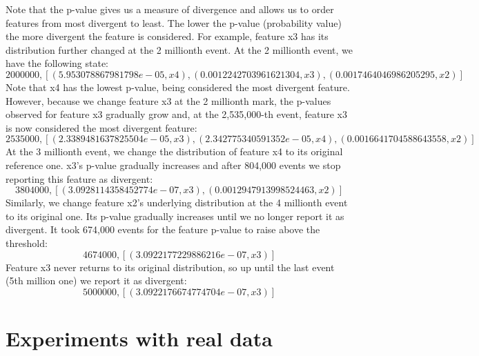 Note that the p-value gives us a measure of divergence and allows us to order features from most divergent to least. The lower the p-value (probability value) the more divergent the feature is considered. For example, feature x3 has its distribution further changed at the 2 millionth event. At the 2 millionth event, we have the following state:
\[2000000, [(5.953078867981798e-05, x4), (0.0012242703961621304, x3), (0.0017464046986205295, x2)]\]
Note that x4 has the lowest p-value, being considered the most divergent feature. However, because we change feature x3 at the 2 millionth mark, the p-values observed for feature x3 gradually grow and, at the 2,535,000-th event, feature x3 is now considered the most divergent feature:
\[2535000, [(2.3389481637825504e-05, x3), (2.342775340591352e-05, x4), (0.0016641704588643558, x2)]\]
At the 3 millionth event, we change the distribution of feature x4 to its original reference one. x3's p-value gradually increases and after 804,000 events we stop reporting this feature as divergent:
\[3804000, [(3.0928114358452774e-07, x3), (0.0012947913998524463, x2)]\]
Similarly, we change feature x2's underlying distribution at the 4 millionth event to its original one. Its p-value gradually increases until we no longer report it as divergent. It took 674,000 events for the feature p-value to raise above the threshold:
\[4674000, [(3.0922177229886216e-07, x3)]\]
Feature x3 never returns to its original distribution, so up until the last event (5th million one) we report it as divergent:
\[5000000, [(3.0922176674774704e-07, x3)]\]

\section{Experiments with real data}


